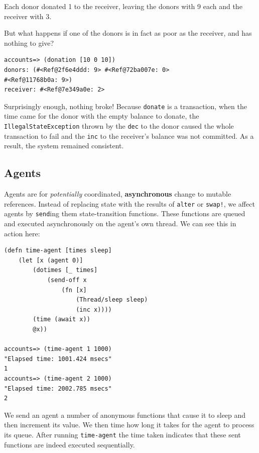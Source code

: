 \documentclass[a4paper,12pt]{kth-mag}
\begin{document}
Each donor donated 1 to the receiver, leaving the donors with 9 each and the receiver with 3.

But what happens if one of the donors is in fact as poor as the receiver, and has nothing to give?

\begin{listing}[H]
	\begin{verbatim}
accounts=> (donation [10 0 10])
donors: (#<Ref@2f6e4ddd: 9> #<Ref@72ba007e: 0> 
#<Ref@11768b0a: 9>)
receiver: #<Ref@7e349a0e: 2>
	\end{verbatim}
\end{listing}

Surprisingly enough, nothing broke! Because \texttt{donate} is a transaction, when the time came for the donor with the empty balance to donate, the \texttt{IllegalStateException} thrown by the \texttt{dec} to the donor caused the whole transaction to fail and the \texttt{inc} to the receiver's balance was not committed. As a result, the system remained consistent.

\subsection{Agents}

Agents are for \textit{potentially} coordinated, \textbf{asynchronous} change to mutable references. Instead of replacing state with the results of \texttt{alter} or \texttt{swap!}, we affect agents by \texttt{send}ing them state-transition functions. These functions are queued and executed asynchronously on the agent's own thread. We can see this in action here:

\begin{listing}[H]
	\begin{verbatim}
(defn time-agent [times sleep]
    (let [x (agent 0)]
        (dotimes [_ times]
            (send-off x
                (fn [x]
                    (Thread/sleep sleep)
                    (inc x))))
        (time (await x))
        @x))
        
accounts=> (time-agent 1 1000)
"Elapsed time: 1001.424 msecs"
1
accounts=> (time-agent 2 1000)
"Elapsed time: 2002.785 msecs"
2
	\end{verbatim}
\end{listing}

We send an agent a number of anonymous functions that cause it to sleep and then increment its value. We then time how long it takes for the agent to process its queue. After running \texttt{time-agent} the time taken indicates that these sent functions are indeed executed sequentially.
\end{document}
